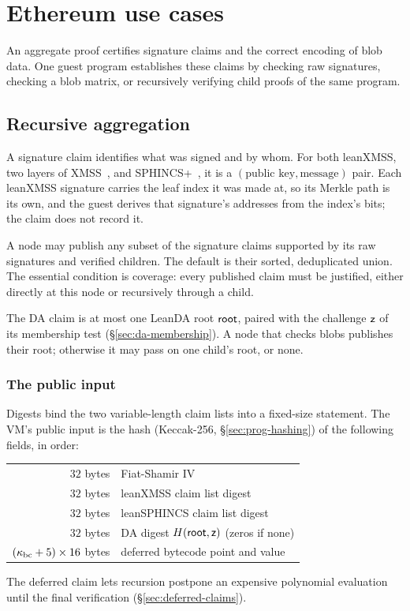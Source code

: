 \section{Ethereum use cases}\label{sec:ethereum}

An aggregate proof certifies signature claims and the correct encoding of blob data. One guest program establishes these claims by checking raw signatures, checking a blob matrix, or recursively verifying child proofs of the same program.

\subsection{Recursive aggregation}\label{sec:recursion}\label{sec:xmss-agg}\label{sec:sphincs-agg}

A signature claim identifies what was signed and by whom. For both leanXMSS, two layers of XMSS~\cite{rfc8391}, and SPHINCS+~\cite{sphincs}, it is a $(\text{public key},\text{message})$ pair. Each leanXMSS signature carries the leaf index it was made at, so its Merkle path is its own, and the guest derives that signature's addresses from the index's bits; the claim does not record it.

A node may publish any subset of the signature claims supported by its raw signatures and verified children. The default is their sorted, deduplicated union. The essential condition is coverage: every published claim must be justified, either directly at this node or recursively through a child.

The DA claim is at most one LeanDA root $\mathsf{root}$, paired with the challenge $\mathsf{z}$ of its membership test (\S\ref{sec:da-membership}). A node that checks blobs publishes their root; otherwise it may pass on one child's root, or none.

\subsubsection{The public input}\label{sec:rec-stmt}

Digests bind the two variable-length claim lists into a fixed-size statement. The VM's public input is the hash (Keccak-256, \S\ref{sec:prog-hashing}) of the following fields, in order:
\begin{center}
\begin{tabular}{@{}rl@{}}
\hline
$32$ bytes & Fiat-Shamir IV\\
$32$ bytes & leanXMSS claim list digest\\
$32$ bytes & leanSPHINCS claim list digest\\
$32$ bytes & DA digest $H(\mathsf{root},\mathsf{z})$ (zeros if none)\\
$(\kappa_{\mathrm{bc}}+5)\times16$ bytes & deferred bytecode point and value\\
\hline
\end{tabular}
\end{center}
The deferred claim lets recursion postpone an expensive polynomial evaluation until the final verification (\S\ref{sec:deferred-claims}).

